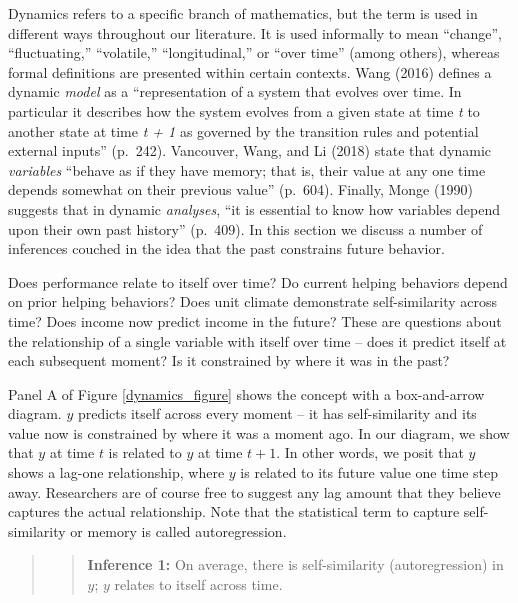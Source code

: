 \documentclass[english,,man]{apa6}
\theoremstyle{definition}
\theoremstyle{definition}
\theoremstyle{definition}
\theoremstyle{remark}
\begin{document}
Dynamics refers to a specific branch of mathematics, but the term is
used in different ways throughout our literature. It is used informally
to mean \enquote{change}, \enquote{fluctuating,} \enquote{volatile,}
\enquote{longitudinal,} or \enquote{over time} (among others), whereas
formal definitions are presented within certain contexts. Wang (2016)
defines a dynamic \emph{model} as a \enquote{representation of a system
that evolves over time. In particular it describes how the system
evolves from a given state at time \emph{t} to another state at time
\emph{t + 1} as governed by the transition rules and potential external
inputs} (p.~242). Vancouver, Wang, and Li (2018) state that dynamic
\emph{variables} \enquote{behave as if they have memory; that is, their
value at any one time depends somewhat on their previous value}
(p.~604). Finally, Monge (1990) suggests that in dynamic
\emph{analyses}, \enquote{it is essential to know how variables depend
upon their own past history} (p.~409). In this section we discuss a
number of inferences couched in the idea that the past constrains future
behavior.

Does performance relate to itself over time? Do current helping
behaviors depend on prior helping behaviors? Does unit climate
demonstrate self-similarity across time? Does income now predict income
in the future? These are questions about the relationship of a single
variable with itself over time -- does it predict itself at each
subsequent moment? Is it constrained by where it was in the past?

Panel A of Figure \ref{dynamics_figure} shows the concept with a
box-and-arrow diagram. \(y\) predicts itself across every moment -- it
has self-similarity and its value now is constrained by where it was a
moment ago. In our diagram, we show that \(y\) at time \(t\) is related
to \(y\) at time \(t + 1\). In other words, we posit that \(y\) shows a
lag-one relationship, where \(y\) is related to its future value one
time step away. Researchers are of course free to suggest any lag amount
that they believe captures the actual relationship. Note that the
statistical term to capture self-similarity or memory is called
autoregression.

\begin{quote}
\begin{quote}
\textbf{Inference 1:} On average, there is self-similarity
(autoregression) in \(y\); \(y\) relates to itself across time.
\end{quote}
\end{quote}
\end{document}
